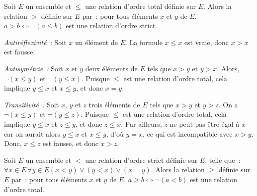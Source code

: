 \blank[medium]

\noindent{} Soit $E$ un ensemble et $\leq$ une relation d'ordre total définie sur $E$. 
    Alors la relation $>$ définie sur $E$ par : pour tous éléments $x$ et $y$ de $E$, $a > b \Leftrightarrow \lnot (a \leq b)$ est une relation d'ordre strict. 

\blank[medium]

\noindent{} 
\startitemize[nowhite]
    \item \emph{Antiréflexivité :} Soit $x$ un élément de $E$. 
        La formule $x \leq x$ est vraie, donc $x > x$ est fausse. 
    \item \emph{Antisymétrie :} Soit $x$ et $y$ deux éléments de $E$ tels que $x > y$ et $y > x$. 
        Alors, $\lnot (x \leq y)$ et $\lnot (y \leq x)$. 
        Puisque $\leq$ est une relation d'ordre total, cela implique $y \leq x$ et $x \leq y$, et donc $x = y$.
    \item \emph{Transitivité :} Soit $x$, $y$ et $z$ trois éléments de $E$ tels que $x > y$ et $y > z$. 
        On a $\lnot (x \leq y)$ et $\lnot (y \leq z)$. 
        Puisque $\leq$ est une relation d'ordre total, cela implique $y \leq x$ et $z \leq y$, et donc $z \leq x$. 
        Par ailleurs, $z$ ne peut pas être égal à $x$ car on aurait alors $y \leq x$ et $x \leq y$, d'où $y = x$, ce qui est incompatible avec $x > y$. 
        Donc, $x \leq z$ est fausse, et donc $x > z$.
\stopitemize

\done

\blank[medium]

\noindent{} Soit $E$ un ensemble et $<$ une relation d'ordre strict définie sur $E$, telle que : $\forall x \in E \, \forall y \in E (x < y) \vee (y < x) \vee (x = y)$. 
    Alors la relation $\geq$ définie sur $E$ par : pour tous éléments $x$ et $y$ de $E$, $a \geq b \Leftrightarrow \lnot (a < b)$ est une relation d'ordre total. 

\blank[medium]

